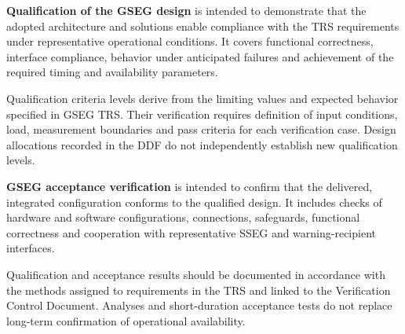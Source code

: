 \textbf{Qualification of the GSEG design} is intended to demonstrate that the adopted architecture and solutions enable compliance with the TRS requirements under representative operational conditions. It covers functional correctness, interface compliance, behavior under anticipated failures and achievement of the required timing and availability parameters.

Qualification criteria levels derive from the limiting values and expected behavior specified in GSEG TRS. Their verification requires definition of input conditions, load, measurement boundaries and pass criteria for each verification case. Design allocations recorded in the DDF do not independently establish new qualification levels.

\textbf{GSEG acceptance verification} is intended to confirm that the delivered, integrated configuration conforms to the qualified design. It includes checks of hardware and software configurations, connections, safeguards, functional correctness and cooperation with representative SSEG and warning-recipient interfaces.

Qualification and acceptance results should be documented in accordance with the methods assigned to requirements in the TRS and linked to the Verification Control Document. Analyses and short-duration acceptance tests do not replace long-term confirmation of operational availability.

\par\noindent{\color{TableBorderBlue}\rule{\linewidth}{0.4pt}}\par
